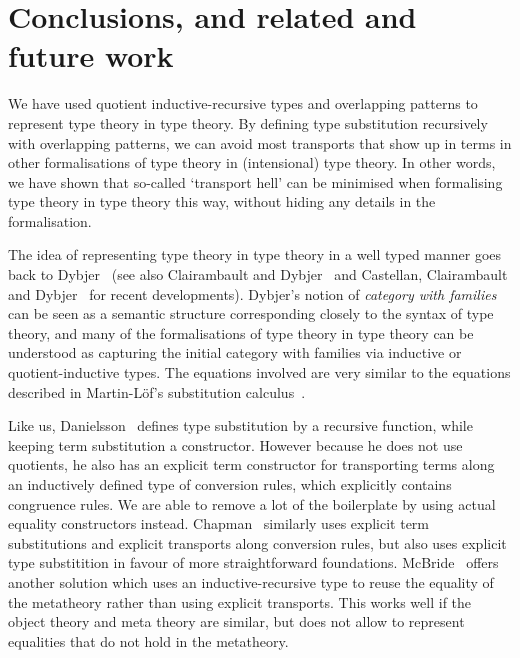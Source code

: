 \documentclass[a4paper,UKenglish,numberwithinsect,cleveref,thm-restate]{lipics-v2021}
\begin{document}
\section{Conclusions, and related and future work}\label{sec:conclusion}

We have used quotient inductive-recursive types and overlapping
patterns to represent type theory in type theory. By defining type
substitution recursively with overlapping patterns, we can avoid most
transports that show up in terms in other formalisations of type
theory in (intensional) type theory. In other words, we have shown that so-called
`transport hell' can be minimised when formalising type theory in type
theory this way, without hiding any details in the formalisation.


The idea of representing type theory in type theory in a well typed manner goes back to Dybjer~\cite{Dybjer1996} (see also Clairambault and Dybjer~\cite{Clairambault2014} and Castellan, Clairambault and Dybjer~\cite{Castellan2021} for recent developments). Dybjer's notion of \emph{category with families} can be seen as a semantic structure corresponding closely to the syntax of type theory, and many of the formalisations of type theory in type theory can be understood as capturing the initial category with families via inductive or quotient-inductive types. The equations involved are very similar to the equations described in Martin-L\"of's substitution calculus~\cite{Martin-Lof1992}.

Like us, Danielsson~\cite{Danielsson2006} defines type substitution by a recursive function, while keeping term substitution a constructor. However because he does not use quotients, he also has an explicit term constructor for transporting terms along an inductively defined type of conversion rules, which explicitly contains congruence rules. We are able to remove a lot of the boilerplate by using actual equality constructors instead. Chapman~\cite{Chapman2009} similarly uses explicit term substitutions and explicit transports along conversion rules, but also uses explicit type substitition in favour of more straightforward foundations.
McBride~\cite{McBride2010} offers another solution which uses an inductive-recursive type to reuse the equality of the metatheory rather than using explicit transports. This works well if the object theory and meta theory are similar, but does not allow to represent equalities that do not hold in the metatheory.
\end{document}
